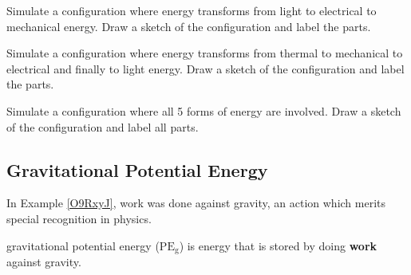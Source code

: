 \documentclass{article}
\numberwithin{equation}{section}
\numberwithin{figure}{section}
\begin{document}
\begin{exercise}
    Simulate a configuration where energy transforms from light to electrical to mechanical energy. Draw a sketch of the configuration and label the parts.
\end{exercise}

\begin{exercise}
    Simulate a configuration where energy transforms from thermal to mechanical to electrical and finally to light energy. Draw a sketch of the configuration and label the parts.
\end{exercise}

\begin{exercise} \label{IPOKOY}
    Simulate a configuration where all 5 forms of energy are involved. Draw a sketch of the configuration and label all parts.
\end{exercise}



\cyanhrule

\subsection{Gravitational Potential Energy} \label{vRflRn}

In Example \ref{O9RxyJ}, work was done against gravity, an action which merits special recognition in physics.


\Gls{gravitational potential energy} ($\mathrm{PE_g}$) is energy that is stored by doing \textbf{work} against gravity.

\begin{center}
\def\height{3}
\end{center}
\end{document}
